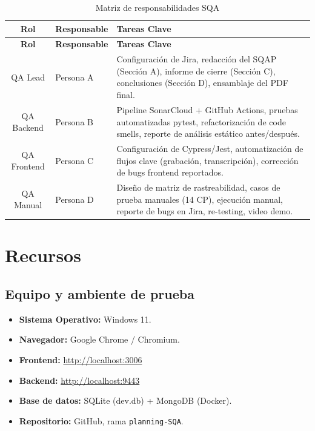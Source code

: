 \begin{longtable}{cp{5cm}p{7cm}}
\caption{Matriz de responsabilidades SQA}
\label{tab:responsabilidades}\\
\toprule
\textbf{Rol} & \textbf{Responsable} & \textbf{Tareas Clave}\\
\midrule
\endfirsthead
\toprule
\textbf{Rol} & \textbf{Responsable} & \textbf{Tareas Clave}\\
\midrule
\endhead
\bottomrule
\endfoot

QA Lead & Persona A & Configuración de Jira, redacción del SQAP (Sección A), informe de cierre (Sección C), conclusiones (Sección D), ensamblaje del PDF final.\\

QA Backend & Persona B & Pipeline SonarCloud + GitHub Actions, pruebas automatizadas pytest, refactorización de code smells, reporte de análisis estático antes/después.\\

QA Frontend & Persona C & Configuración de Cypress/Jest, automatización de flujos clave (grabación, transcripción), corrección de bugs frontend reportados.\\

QA Manual & Persona D & Diseño de matriz de rastreabilidad, casos de prueba manuales (14 CP), ejecución manual, reporte de bugs en Jira, re-testing, video demo.\\

\end{longtable}

\section{Recursos}
\label{sec:recursos}

\subsection{Equipo y ambiente de prueba}
\label{subsec:ambiente}

\begin{itemize}
    \item \textbf{Sistema Operativo:} Windows 11.
    \item \textbf{Navegador:} Google Chrome / Chromium.
    \item \textbf{Frontend:} \url{http://localhost:3006}
    \item \textbf{Backend:} \url{http://localhost:9443}
    \item \textbf{Base de datos:} SQLite (dev.db) + MongoDB (Docker).
    \item \textbf{Repositorio:} GitHub, rama \texttt{planning-SQA}.
\end{itemize}


